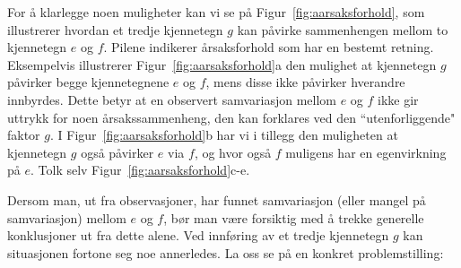For å klarlegge noen muligheter kan vi se på Figur~\ref{fig:aarsaksforhold}, som illustrerer
hvordan et tredje kjennetegn $g$ kan påvirke sammenhengen mellom to 
kjennetegn $e$ og $f$.  Pilene indikerer årsaksforhold som har en bestemt
 retning. Eksempelvis 
illustrerer Figur~\ref{fig:aarsaksforhold}a den mulighet at kjennetegn $g$ påvirker begge
kjennetegnene $e$ og $f$, mens disse ikke påvirker hverandre innbyrdes.
Dette betyr at en observert samvariasjon mellom $e$ og $f$ ikke gir
uttrykk for noen årsakssammenheng, den kan forklares ved den
``utenforliggende" faktor $g$.  I Figur~\ref{fig:aarsaksforhold}b har vi i tillegg den muligheten
at kjennetegn $g$ også påvirker $e$ via $f$, og hvor også
$f$ muligens har en egenvirkning på $e$.  Tolk selv Figur~\ref{fig:aarsaksforhold}c-e.  

Dersom man, ut fra observasjoner, har funnet samvariasjon (eller mangel
på samvariasjon) mellom $e$ og $f$, bør man være forsiktig
med å trekke generelle konklusjoner ut fra dette alene.  Ved 
innføring av et tredje kjennetegn $g$ kan situasjonen fortone seg noe
annerledes.  La oss se på en konkret problemstilling:\\

